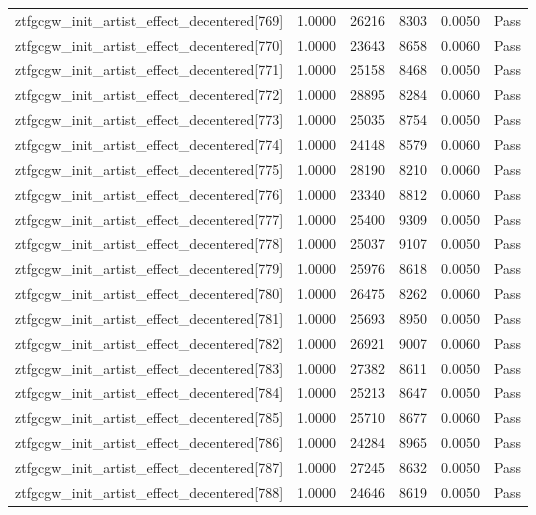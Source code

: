 \begin{table}[htbp]
\begin{tabular}{llrrll}
ztfgcgw\_init\_artist\_effect\_decentered[769] & 1.0000 & 26216 & 8303 & 0.0050 & Pass \\
ztfgcgw\_init\_artist\_effect\_decentered[770] & 1.0000 & 23643 & 8658 & 0.0060 & Pass \\
ztfgcgw\_init\_artist\_effect\_decentered[771] & 1.0000 & 25158 & 8468 & 0.0050 & Pass \\
ztfgcgw\_init\_artist\_effect\_decentered[772] & 1.0000 & 28895 & 8284 & 0.0060 & Pass \\
ztfgcgw\_init\_artist\_effect\_decentered[773] & 1.0000 & 25035 & 8754 & 0.0050 & Pass \\
ztfgcgw\_init\_artist\_effect\_decentered[774] & 1.0000 & 24148 & 8579 & 0.0060 & Pass \\
ztfgcgw\_init\_artist\_effect\_decentered[775] & 1.0000 & 28190 & 8210 & 0.0060 & Pass \\
ztfgcgw\_init\_artist\_effect\_decentered[776] & 1.0000 & 23340 & 8812 & 0.0060 & Pass \\
ztfgcgw\_init\_artist\_effect\_decentered[777] & 1.0000 & 25400 & 9309 & 0.0050 & Pass \\
ztfgcgw\_init\_artist\_effect\_decentered[778] & 1.0000 & 25037 & 9107 & 0.0050 & Pass \\
ztfgcgw\_init\_artist\_effect\_decentered[779] & 1.0000 & 25976 & 8618 & 0.0050 & Pass \\
ztfgcgw\_init\_artist\_effect\_decentered[780] & 1.0000 & 26475 & 8262 & 0.0060 & Pass \\
ztfgcgw\_init\_artist\_effect\_decentered[781] & 1.0000 & 25693 & 8950 & 0.0050 & Pass \\
ztfgcgw\_init\_artist\_effect\_decentered[782] & 1.0000 & 26921 & 9007 & 0.0060 & Pass \\
ztfgcgw\_init\_artist\_effect\_decentered[783] & 1.0000 & 27382 & 8611 & 0.0050 & Pass \\
ztfgcgw\_init\_artist\_effect\_decentered[784] & 1.0000 & 25213 & 8647 & 0.0050 & Pass \\
ztfgcgw\_init\_artist\_effect\_decentered[785] & 1.0000 & 25710 & 8677 & 0.0060 & Pass \\
ztfgcgw\_init\_artist\_effect\_decentered[786] & 1.0000 & 24284 & 8965 & 0.0050 & Pass \\
ztfgcgw\_init\_artist\_effect\_decentered[787] & 1.0000 & 27245 & 8632 & 0.0050 & Pass \\
ztfgcgw\_init\_artist\_effect\_decentered[788] & 1.0000 & 24646 & 8619 & 0.0050 & Pass \\

\end{tabular}
\end{table}
